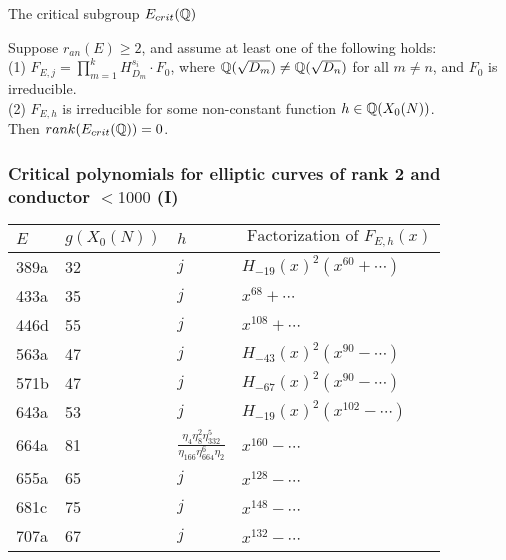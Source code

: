 \documentclass[handout]{beamer}
\begin{document}
\begin{frame}{The critical subgroup $E_{crit}(\mathbb{Q})$}
\begin{Theorem}[C.]
\label{cor: cm}
Suppose $r_{an}(E) \geq 2$, and assume at least one of the following holds: \\
(1) $F_{E,j} = \prod_{m =1}^k H_{D_m}^{s_i}\cdot F_0$, where 
$\mathbb{Q}(\sqrt{D_m}) \neq \mathbb{Q}(\sqrt{D_n})$ for all $m\neq n$, and $F_0$ is irreducible. \\
(2) $F_{E,h}$ is irreducible for some non-constant function $h \in \mathbb{Q}(X_0(N))$. \\
Then $rank(E_{crit}(\mathbb{Q}))  = 0$. 
\end{Theorem}
\end{frame}



\begin{frame}
\frametitle{Critical polynomials for elliptic curves of rank 2 and conductor $<1000$ (I)}
\begin{center}
   \begin{table}[h!]
    \begin{tabular}{ | l | l | l | |p{4.4cm}  |}
    \hline
    $E$ & $g(X_0(N))$    & $h$ & $\mbox{ Factorization of } F_{E,h}(x)$     \\ \hline \hline
    389a & 32  & $j$ & $H_{-19}(x)^2 (x^{60}+ \cdots)$ \\ \hline
    433a & 35  & $j$ &  $x^{68}+\cdots$  \\ \hline
     446d & 55  & $j$ &  $x^{108}+\cdots$ \\ \hline
    563a & 47  & $j$ &  $H_{-43}(x)^2 (x^{90} - \cdots)$   \\ \hline
    571b& 47  & $j$ &  $H_{-67}(x)^2 (x^{90} - \cdots)$ \\ \hline
    643a& 53  & $j$ &  $H_{-19}(x)^2 (x^{102} - \cdots)$ \\ \hline
    664a & 81    &   $\frac{\eta_4\eta_8^2 \eta_{332}^5}{\eta_{166}\eta_{664}^{6}{\eta_2}}$ & $x^{160} - \cdots$ \\ \hline
    655a& 65  & $j$ &  $x^{128} - \cdots$ \\  \hline
    681c& 75  & $j$ &  $x^{148} - \cdots$ \\  \hline
    707a & 67  & $j$ & $x^{132} - \cdots$ 
        \end{tabular}
    \label{table: rank two}	
   \end{table}
\end{center}


\end{frame}
 
\end{document}

